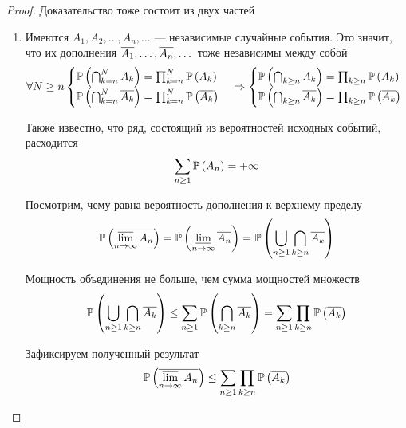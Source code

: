 \begin{proof} Доказательство тоже состоит из двух частей
    \begin{enumerate}[label=\alph*]
    \item 
        Имеются $A_1, A_2, \dots, A_n, \dots$ --- независимые случайные события.
        Это значит, что их дополнения $\overline{A_1}, \dots, \overline{A_n}, \dots$
        тоже независимы между собой
        \begin{align*}
            \forall N\ge n
            \begin{cases}
                \mathbb{P}\left( \bigcap_{k=n}^NA_k \right)
                    =\prod_{k=n}^N\mathbb{P}\left( A_k \right)\\
                \mathbb{P}\left( \bigcap_{k=n}^N\overline{A_k} \right)
                    =\prod_{k=n}^N\mathbb{P}\left( \overline{A_k} \right)
            \end{cases}
            \Rightarrow
            \begin{cases}
                \mathbb{P}\left( \bigcap_{k\ge n}A_k \right)
                    =\prod_{k\ge n}\mathbb{P}\left( A_k \right)\\
                \mathbb{P}\left( \bigcap_{k\ge n}\overline{A_k} \right)
                    =\prod_{k\ge n}\mathbb{P}\left( \overline{A_k} \right)
            \end{cases}
        \end{align*}

        Также известно, что ряд, состоящий из вероятностей исходных событий,
        расходится
        $$\sum_{n\ge 1}\mathbb{P}\left( A_n \right)=+\infty$$

        Посмотрим, чему равна вероятность дополнения к верхнему пределу
        $$\mathbb{P}\left( \overline{\varlimsup_{n\to\infty}A_n} \right)
            =\mathbb{P}\left( \varliminf_{n\to\infty}\overline{A_n} \right)
            =\mathbb{P}\left( \bigcup_{n\ge 1}\bigcap_{k\ge n}\overline{A_k} \right)$$

        Мощность объединения не больше, чем сумма мощностей множеств
        \begin{align*}
        \mathbb{P}\left( \bigcup_{n\ge 1}\bigcap_{k\ge n}\overline{A_k} \right)
            \le \sum_{n\ge 1}\mathbb{P}\left( \bigcap_{k\ge n}\overline{A_k} \right)
            &= \sum_{n\ge 1}\prod_{k\ge n}\mathbb{P}\left( \overline{A_k} \right)\\
        \end{align*}

        Зафиксируем полученный результат
        \begin{equation}\label{eq:bc_start_a}
            \mathbb{P}\left( \overline{\varlimsup_{n\to\infty}A_n} \right)
            \le \sum_{n\ge 1}\prod_{k\ge n}\mathbb{P}\left( \overline{A_k} \right)
        \end{equation}
        

\end{enumerate}
\end{proof}
